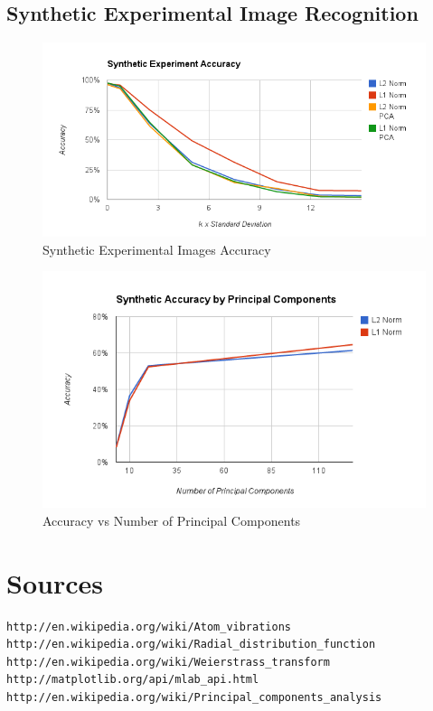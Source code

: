 \documentclass[12pt,letterpaper]{article}
\begin{document}
\subsection{Synthetic Experimental Image Recognition}
\begin{figure}[ht]
  \begin{center}
    \includegraphics[scale=0.8]{figs/accuracy_with_pca.png}
    \caption{Synthetic Experimental Images Accuracy}
  \end{center}
\end{figure}

\begin{figure}[ht]
  \begin{center}
    \includegraphics[scale=0.8]{figs/accuracy_by_num_pc.png}
    \caption{Accuracy vs Number of Principal Components}
  \end{center}
\end{figure}
\clearpage


\section{Sources}
\begin{verbatim}
http://en.wikipedia.org/wiki/Atom_vibrations
http://en.wikipedia.org/wiki/Radial_distribution_function
http://en.wikipedia.org/wiki/Weierstrass_transform
http://matplotlib.org/api/mlab_api.html
http://en.wikipedia.org/wiki/Principal_components_analysis
\end{verbatim}
\end{document}
